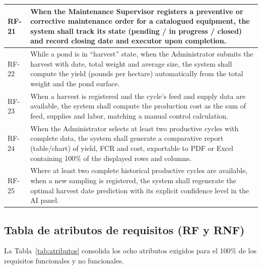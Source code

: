 \documentclass[11pt,a4paper]{article}
\renewcommand{\_}{\textunderscore\allowbreak}
\begin{document}
\begin{longtable}{|p{1.3cm}|p{13.2cm}|}
\hline
RF-21 & When the Maintenance Supervisor registers a preventive or corrective maintenance order for a catalogued equipment, the system shall track its state (pending / in progress / closed) and record closing date and executor upon completion.\\
\hline
RF-22 & While a pond is in ``harvest'' state, when the Administrator submits the harvest with date, total weight and average size, the system shall compute the yield (pounds per hectare) automatically from the total weight and the pond surface.\\
\hline
RF-23 & When a harvest is registered and the cycle's feed and supply data are available, the system shall compute the production cost as the sum of feed, supplies and labor, matching a manual control calculation.\\
\hline
RF-24 & When the Administrator selects at least two productive cycles with complete data, the system shall generate a comparative report (table/chart) of yield, FCR and cost, exportable to PDF or Excel containing 100\% of the displayed rows and columns.\\
\hline
RF-25 & Where at least two complete historical productive cycles are available, when a new sampling is registered, the system shall regenerate the optimal harvest date prediction with its explicit confidence level in the AI panel.\\

\end{longtable}

\subsection{Tabla de atributos de requisitos (RF y RNF)}
La Tabla~\ref{tab:atributos} consolida los ocho atributos exigidos para el 100\% de los requisitos funcionales y no funcionales.
\end{document}
